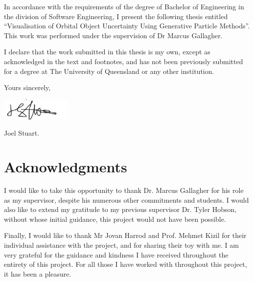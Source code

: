 \documentclass[12pt,openany,a4paper]{book}
\renewcommand{\baselinestretch}{1.2}	%
\begin{document}
	In accordance with the requirements of the degree of Bachelor of
	Engineering in the division of 
	Software Engineering,
	I present the
	following thesis entitled ``Visualisation of Orbital Object Uncertainty Using Generative Particle Methods''.  This work was performed under the supervision of
	Dr Marcus Gallagher. \newline
	
	
	
	I declare that the work submitted in this thesis is my own, except as
	acknowledged in the text and footnotes, and has not been previously
	submitted for a degree at The University of Queensland or any other
	institution. \newline
	
	
	\begin{flushright}
		Yours sincerely,\\
		\medskip
		\begin{flushright}
					\includegraphics[scale=0.6]{JS.png}
		\end{flushright}
		\medskip
		Joel Stuart.
	\end{flushright}
	
	\clearpage
	
	
	\chapter{Acknowledgments}
	
	I would like to take this opportunity to thank Dr. Marcus Gallagher for his role as my supervisor, despite his numerous other commitments and students. I would also like to extend my gratitude to my previous supervisor Dr. Tyler Hobson, without whose initial guidance, this project would not have been possible. \newline
	
	Finally, I would like to thank Mr Jovan Harrod and Prof. Mehmet Kizil for their individual assistance with the project, and for sharing their toy with me. I am very grateful for the guidance and kindness I have received throughout the entirety of this project. For all those I have worked with throughout this project, it has been a pleasure.  \newline
	
\end{document}
